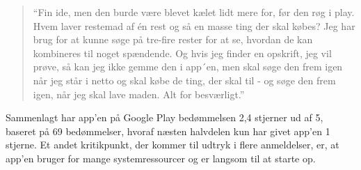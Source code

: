 \begin{quote}
``Fin ide, men den burde være blevet kælet lidt mere for, før den røg i play. Hvem laver restemad af én rest og så en masse ting der skal købes? Jeg har brug for at kunne søge på tre-fire rester for at se, hvordan de kan kombineres til noget spændende. Og hvis jeg finder en opskrift, jeg vil prøve, så kan jeg ikke gemme den i app´en, men skal søge den frem igen når jeg står i netto og skal købe de ting, der skal til - og søge den frem igen, når jeg skal lave maden. Alt for besværligt.''
\end{quote}

Sammenlagt har app’en på Google Play bedømmelsen 2,4 stjerner ud af 5, baseret på 69 bedømmelser, hvoraf næsten halvdelen kun har givet app’en 1 stjerne. Et andet kritikpunkt, der kommer til udtryk i flere anmeldelser, er, at app’en bruger for mange systemressourcer og er langsom til at starte op.
